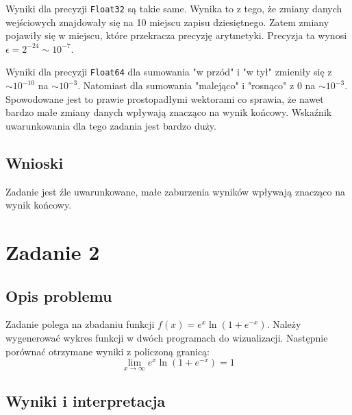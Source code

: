\documentclass{article}
\begin{document}
Wyniki dla precyzji  \texttt{Float32} są takie same. Wynika to z tego, że zmiany danych wejściowych znajdowały się na 10 miejscu zapisu dziesiętnego. Zatem zmiany pojawiły się w miejscu, które przekracza precyzję arytmetyki. Precyzja ta wynosi $\epsilon =2^{-24} \sim 10^{-7}$.

Wyniki dla precyzji \texttt{Float64} dla sumowania "w przód" i "w tył" zmieniły się z $\sim 10^{-10}$ na $\sim 10^{-3}$. Natomiast dla sumowania "malejąco" i "rosnąco" z 0 na $\sim 10^{-3}$. Spowodowane jest to prawie prostopadłymi wektorami co sprawia, że nawet bardzo małe zmiany danych wpływają znacząco na wynik końcowy. Wskaźnik uwarunkowania dla tego zadania jest bardzo duży.
\subsection*{Wnioski}
Zadanie jest źle uwarunkowane, małe zaburzenia wyników wpływają znacząco na wynik końcowy.

\section*{Zadanie 2}
\subsection*{Opis problemu}
Zadanie polega na zbadaniu funkcji $f(x)=e^x \ln (1+e^{-x})$. Należy wygenerować wykres funkcji w dwóch programach do wizualizacji. Następnie porównać otrzymane wyniki z policzoną granicą:
\[ \lim_{x \rightarrow \infty} e^x \ln (1+e^{-x})=1\]

\subsection*{Wyniki i interpretacja}
\end{document}
